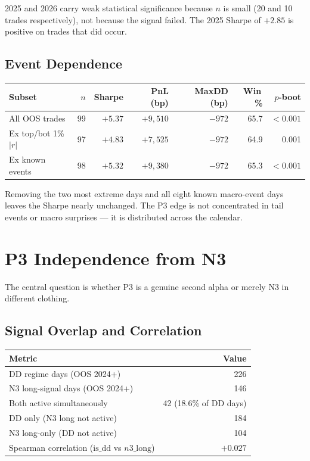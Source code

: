 \documentclass[12pt, a4paper]{article}
\theoremstyle{plain}
\theoremstyle{definition}
\begin{document}
2025 and 2026 carry weak statistical significance because $n$ is small
(20 and 10 trades respectively), not because the signal failed.
The 2025 Sharpe of $+2.85$ is positive on trades that did occur.

\subsection{Event Dependence}

\begin{center}
\begin{tabular}{lrrrrrr}
\toprule
Subset & $n$ & Sharpe & PnL (bp) & MaxDD (bp) & Win\,\% & $p$-boot \\
\midrule
All OOS trades          & 99 & $+5.37$ & $+9{,}510$ & $-972$ & 65.7 & $<0.001$ \\
Ex top/bot 1\% $|r|$   & 97 & $+4.83$ & $+7{,}525$ & $-972$ & 64.9 & 0.001   \\
Ex known events         & 98 & $+5.32$ & $+9{,}380$ & $-972$ & 65.3 & $<0.001$ \\
\bottomrule
\end{tabular}
\end{center}

Removing the two most extreme days and all eight known macro-event days
leaves the Sharpe nearly unchanged.  The P3 edge is not concentrated in
tail events or macro surprises --- it is distributed across the calendar.

\section{P3 Independence from N3}
\label{sec:p3independence}

The central question is whether P3 is a genuine second alpha or merely
N3 in different clothing.

\subsection{Signal Overlap and Correlation}

\begin{center}
\begin{tabular}{lr}
\toprule
Metric & Value \\
\midrule
DD regime days (OOS 2024+)      & 226 \\
N3 long-signal days (OOS 2024+) & 146 \\
Both active simultaneously       &  42 \quad (18.6\% of DD days) \\
DD only (N3 long not active)     & 184 \\
N3 long-only (DD not active)     & 104 \\
\midrule
Spearman correlation ($\mathrm{is\_dd}$ vs $n3\_\mathrm{long}$) & $+0.027$ \\
\bottomrule
\end{tabular}
\end{center}
\end{document}
